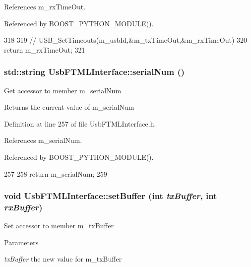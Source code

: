 References m\_\-rxTimeOut.

Referenced by BOOST\_\-PYTHON\_\-MODULE().


\begin{DoxyCode}
318                    {
319     //    USB_SetTimeouts(m_usbId,&m_txTimeOut,&m_rxTimeOut)
320     return m_rxTimeOut;
321   }
\end{DoxyCode}
\hypertarget{classUsbFTMLInterface_a6b005503472f0ff0357662555275cba4}{
\subsubsection[{serialNum}]{\setlength{\rightskip}{0pt plus 5cm}std::string UsbFTMLInterface::serialNum ()}}
\label{classUsbFTMLInterface_a6b005503472f0ff0357662555275cba4}
Get accessor to member m\_\-serialNum \begin{DoxyReturn}{Returns}
the current value of m\_\-serialNum 
\end{DoxyReturn}


Definition at line 257 of file UsbFTMLInterface.h.

References m\_\-serialNum.

Referenced by BOOST\_\-PYTHON\_\-MODULE().


\begin{DoxyCode}
257                          {
258     return m_serialNum;
259   }
\end{DoxyCode}
\hypertarget{classUsbFTMLInterface_a0223b6508fe1ac8da3aee952da113b1a}{
\subsubsection[{setBuffer}]{\setlength{\rightskip}{0pt plus 5cm}void UsbFTMLInterface::setBuffer (int {\em txBuffer}, \/  int {\em rxBuffer})}}
\label{classUsbFTMLInterface_a0223b6508fe1ac8da3aee952da113b1a}
Set accessor to member m\_\-txBuffer 
\begin{DoxyParams}{Parameters}
\item[{\em txBuffer}]the new value for m\_\-txBuffer \end{DoxyParams}


